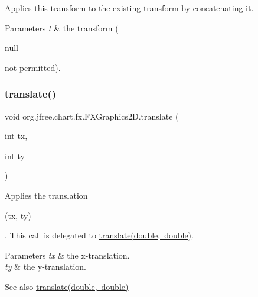 Applies this transform to the existing transform by concatenating it.


\begin{DoxyParams}{Parameters}
{\em t} & the transform (
\begin{DoxyCode}
null 
\end{DoxyCode}
 not permitted). \\
\hline
\end{DoxyParams}
\mbox{\label{classorg_1_1jfree_1_1chart_1_1fx_1_1_f_x_graphics2_d_a43b6cee98e356c04c4c3ce1e3c9e43f8}} 
\subsubsection{\texorpdfstring{translate()}{translate()}\hspace{0.1cm}{\footnotesize\ttfamily [1/2]}}
{\footnotesize\ttfamily void org.\+jfree.\+chart.\+fx.\+F\+X\+Graphics2\+D.\+translate (\begin{DoxyParamCaption}\item[{int}]{tx,  }\item[{int}]{ty }\end{DoxyParamCaption})}

Applies the translation
\begin{DoxyCode}
(tx, ty) 
\end{DoxyCode}
 . This call is delegated to \mbox{\hyperlink{classorg_1_1jfree_1_1chart_1_1fx_1_1_f_x_graphics2_d_ad554b156d4cb31cb2700f41612b23514}{translate(double, double)}}.


\begin{DoxyParams}{Parameters}
{\em tx} & the x-\/translation. \\
\hline
{\em ty} & the y-\/translation.\\
\hline
\end{DoxyParams}
\begin{DoxySeeAlso}{See also}
\mbox{\hyperlink{classorg_1_1jfree_1_1chart_1_1fx_1_1_f_x_graphics2_d_ad554b156d4cb31cb2700f41612b23514}{translate(double, double)}} 
\end{DoxySeeAlso}
\mbox{\label{classorg_1_1jfree_1_1chart_1_1fx_1_1_f_x_graphics2_d_ad554b156d4cb31cb2700f41612b23514}} 

